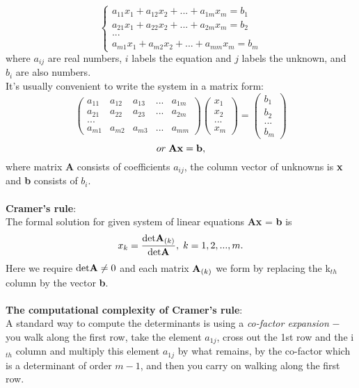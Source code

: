 \documentclass{article}
\begin{document}
\begin{equation*}
\begin{cases}
    a_{11}x_1 + a_{12}x_2 + ... + a_{1m}x_m = b_1\\
    a_{21}x_1 + a_{22}x_2 + ... + a_{2m}x_m = b_2\\
    ...\\
    a_{m1}x_1 + a_{m2}x_2 + ... + a_{mm}x_m = b_m
\end{cases}
\end{equation*}
where $a_{ij}$ are real numbers, $i$ labels the equation and $j$ labels the unknown, and $b_i$ are also numbers.\\
It's usually convenient to write the system in
a matrix form:\\
\[
\begin{pmatrix}
    a_{11} & a_{12} & a_{13} & ... & a_{1m}\\
    a_{21} & a_{22} & a_{23} & ... & a_{2m}\\
    ...\\
    a_{m1} & a_{m2} & a_{m3} & ... & a_{mm}
\end{pmatrix}
\begin{pmatrix}
    x_1\\
    x_2\\
    ...\\
    x_m
\end{pmatrix}
=
\begin{pmatrix}
    b_1\\
    b_2\\
    ...\\
    b_m
\end{pmatrix}
\]
\[
    or\; {\bf Ax} = {\bf b},
\]
where matrix {\bf A} consists of coefficients $a_{ij}$, the column vector of unknowns is {\bf x} and {\bf b} consists of $b_i$.\\
\\{\bf Cramer's rule}:\\
The formal solution for given system of linear equations {\bf Ax} = {\bf b} is
\[
x_k = \frac{{\rm det}{\bf A}_{(k)}}{{\rm det}{\bf A}}, \; k = 1,2,...,m.
\]
Here we require ${\rm det}{\bf A} \neq 0$ and each matrix ${\bf A}_{(k)}$ we form by replacing the k$_{th}$ column by the vector {\bf b}.\\
\\{\bf The computational complexity of Cramer's rule}:\\
A standard way to compute the determinants is using a {\it co-factor expansion} $-$ you walk along the first row, take the element $a_{1j}$, cross out the 1st row and the i$_{th}$ column and multiply this element $a_{1j}$ by what remains, by the co-factor which is a determinant of order $m-1$, and then you carry on walking along the first row.\\
\end{document}
